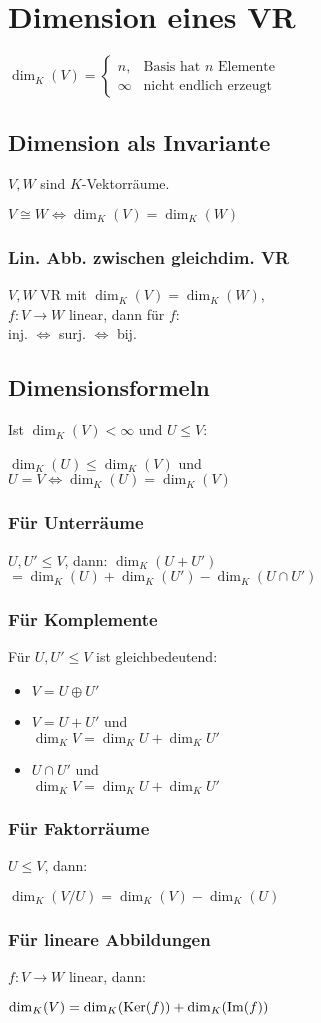 \section*{Dimension eines VR}

$\dim_K(V)=\begin{cases}
	n, & \text{Basis hat $n$ Elemente}\\
	\infty & \text{nicht endlich erzeugt}
\end{cases}$

\subsection*{Dimension als Invariante}
$V,W$ sind $K$-Vektorräume.

$V \cong W \iff \dim_K(V) = \dim_K(W)$

\subsubsection*{Lin. Abb. zwischen gleichdim. VR}
$V,W$ VR mit $\dim_K(V)=\dim_K(W)$, \\
$f:V\to W$ linear, dann für $f$: \\
inj. $\iff$ surj. $\iff$ bij.

\subsection*{Dimensionsformeln}
Ist $\dim_K(V)<\infty$ und $U \le V$:

$\dim_K(U) \le \dim_K(V)$ und \\
$U = V \iff \dim_K(U) = \dim_K(V)$

\subsubsection*{Für Unterräume}
$U,U' \le V$, dann:
$\dim_K(U+U')$ \\ $=\dim_K(U)+\dim_K(U')-\dim_K(U\cap U')$

\subsubsection*{Für Komplemente}
Für $U,U' \le V$ ist gleichbedeutend:
\begin{itemize}
	\item $V=U \oplus U'$
	\item $V=U+U'$ und \\ $\dim_K V = \dim_K U + \dim_K U'$
	\item $U \cap U'$ und \\ $\dim_K V = \dim_K U + \dim_K U'$
\end{itemize}

\subsubsection*{Für Faktorräume}
$U \le V$, dann:

$\dim_K(V/U) = \dim_K(V)-\dim_K(U)$

\subsubsection*{Für lineare Abbildungen}
$f: V \to W$ linear, dann:

$\dim_K(V) = \dim_K(\operatorname{Ker}(f)) + \dim_K(\operatorname{Im}(f))$

